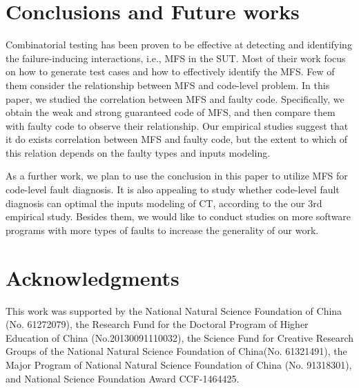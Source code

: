 \documentclass{sig-alternate-05-2015}
\begin{document}
\section{Conclusions and Future works}\label{sec:conclusion}
Combinatorial testing has been proven to be effective at detecting and identifying the failure-inducing interactions, i.e., MFS in the SUT. Most of their work focus on how to generate test cases and how to effectively identify the MFS. Few of them consider the relationship between MFS and code-level problem. In this paper, we studied the correlation between MFS and faulty code. Specifically, we obtain the weak and strong guaranteed code of MFS, and then compare them with faulty code to observe their relationship. Our empirical studies suggest that it do exists correlation between MFS and faulty code, but the extent to which of this relation depends on the faulty types and inputs modeling.


As a further work, we plan to use the conclusion in this paper to utilize MFS for code-level fault diagnosis. It is also appealing to study whether code-level fault diagnosis can optimal the inputs modeling of CT, according to the our 3rd empirical study. Besides them, we would like to conduct studies on more software programs with more types of faults to increase the generality of our work.

\section{Acknowledgments}
This work was supported by the National Natural Science Foundation of China (No. 61272079), the Research Fund for the Doctoral Program of Higher Education of China (No.20130091110032), the Science Fund for Creative Research Groups of the National Natural Science Foundation of China(No. 61321491), the Major Program of National Natural Science Foundation of China (No. 91318301), and National Science Foundation Award CCF-1464425.
\end{document}
